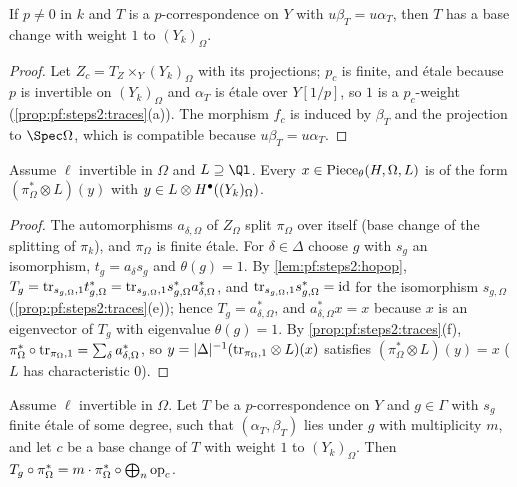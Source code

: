 \begin{lemma}\label{lem:pf:steps2:bcex}
If $p\ne0$ in $k$ and $T$ is a $p$-correspondence on $Y$ with $u\beta_T=u\alpha_T$, then $T$ has a base
change with weight $1$ to $(Y_k)_\Omega$.
\end{lemma}

\begin{proof}
Let $Z_c=T_Z\times_Y(Y_k)_\Omega$ with its projections; $p_c$ is finite, and \'etale because $p$ is
invertible on $(Y_k)_\Omega$ and $\alpha_T$ is \'etale over $Y[1/p]$, so $1$ is a $p_c$-weight
(\cref{prop:pf:steps2:traces}(a)). The morphism $f_c$ is induced by $\beta_T$ and the projection to
$\Spec\Omega$, which is compatible because $u\beta_T=u\alpha_T$.
\end{proof}

\begin{lemma}\label{lem:pf:steps2:fixdesc}
Assume $\ell$ invertible in $\Omega$ and $L\supseteq\Ql$. Every $x\in\mathrm{Piece}_\theta(H,\Omega,L)$
is of the form $(\pi_\Omega^\ast\otimes L)(y)$ with $y\in L\otimes H^{\bullet}((Y_k)_\Omega)$.
\end{lemma}

\begin{proof}
The automorphisms $a_{\delta,\Omega}$ of $Z_\Omega$ split $\pi_\Omega$ over itself (base change of the
splitting of $\pi_k$), and $\pi_\Omega$ is finite \'etale. For $\delta\in\Delta$ choose $g$ with $s_g$
an isomorphism, $t_g=a_\delta s_g$ and $\theta(g)=1$. By \cref{lem:pf:steps2:hopop},
$T_g=\mathrm{tr}_{s_{g,\Omega},1}t_{g,\Omega}^\ast=\mathrm{tr}_{s_{g,\Omega},1}s_{g,\Omega}^\ast
a_{\delta,\Omega}^\ast$, and $\mathrm{tr}_{s_{g,\Omega},1}s_{g,\Omega}^\ast=\mathrm{id}$ for the
isomorphism $s_{g,\Omega}$ (\cref{prop:pf:steps2:traces}(e)); hence $T_g=a_{\delta,\Omega}^\ast$, and
$a_{\delta,\Omega}^\ast x=x$ because $x$ is an eigenvector of $T_g$ with eigenvalue $\theta(g)=1$. By
\cref{prop:pf:steps2:traces}(f), $\pi_\Omega^\ast\circ\mathrm{tr}_{\pi_\Omega,1}=\sum_\delta
a_{\delta,\Omega}^\ast$, so $y=|\Delta|^{-1}(\mathrm{tr}_{\pi_\Omega,1}\otimes L)(x)$ satisfies
$(\pi_\Omega^\ast\otimes L)(y)=x$ ($L$ has characteristic $0$).
\end{proof}

\begin{lemma}\label{lem:pf:steps2:liesop}
Assume $\ell$ invertible in $\Omega$. Let $T$ be a $p$-correspondence on $Y$ and $g\in\Gamma$ with
$s_g$ finite \'etale of some degree, such that $(\alpha_T,\beta_T)$ lies under $g$ with multiplicity
$m$, and let $c$ be a base change of $T$ with weight $1$ to $(Y_k)_\Omega$. Then
$T_g\circ\pi_\Omega^\ast=m\cdot\pi_\Omega^\ast\circ\bigoplus_n\mathrm{op}_c$.
\end{lemma}

